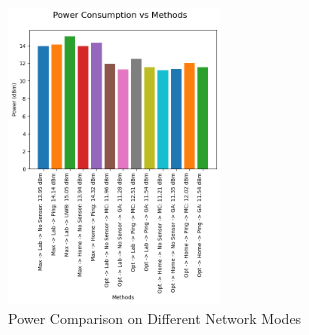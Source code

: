 \begin{figure}[H]
  \centering
  \includegraphics[width=0.5\textwidth]{images/research_results/current_consumption_analysis/overview.png}
    \caption{Power Comparison on Different Network Modes}
    \label{fig:power_comparison_on_different_network_modes}
\end{figure}

